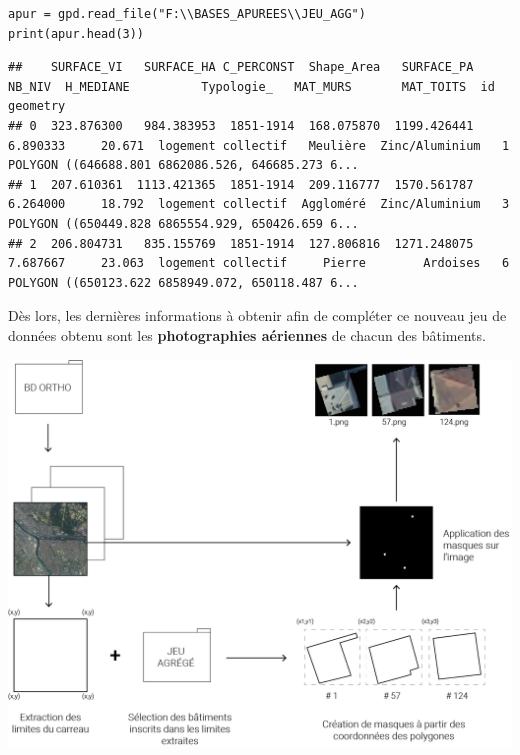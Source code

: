 \documentclass[
  11pt,
  french,
]{article}
\newcounter{customfigs}[section]
\newenvironment{customfigs}[1][] {
    \stepcounter{customfigs}
    Fig \arabic{section}. \arabic{customfigs} : }
\newcommand{\masked}{\vspace*{-\baselineskip}}
\begin{document}
\begin{tcolorbox}[title= Aperçu du jeu de données agrégé ,colback=boitecode]
\begin{lstlisting}[style=code]
apur = gpd.read_file("F:\\BASES_APUREES\\JEU_AGG")
print(apur.head(3))\end{lstlisting}
\begin{lstlisting}[style=out]
##    SURFACE_VI   SURFACE_HA C_PERCONST  Shape_Area   SURFACE_PA    NB_NIV  H_MEDIANE          Typologie_   MAT_MURS       MAT_TOITS  id                                           geometry
## 0  323.876300   984.383953  1851-1914  168.075870  1199.426441  6.890333     20.671  logement collectif   Meulière  Zinc/Aluminium   1  POLYGON ((646688.801 6862086.526, 646685.273 6...
## 1  207.610361  1113.421365  1851-1914  209.116777  1570.561787  6.264000     18.792  logement collectif  Aggloméré  Zinc/Aluminium   3  POLYGON ((650449.828 6865554.929, 650426.659 6...
## 2  206.804731   835.155769  1851-1914  127.806816  1271.248075  7.687667     23.063  logement collectif     Pierre        Ardoises   6  POLYGON ((650123.622 6858949.072, 650118.487 6...
\end{lstlisting}
\end{tcolorbox}

\hfill\break
\hfill\break
Dès lors, les dernières informations à obtenir afin de compléter ce
nouveau jeu de données obtenu sont les \textbf{photographies aériennes}
de chacun des bâtiments.\\

\begin{tcolorbox}[title=\begin{customfigs} Principe de l'extraction des photographies aériennes \end{customfigs}]

\begin{center}\includegraphics[width=1\linewidth]{__imgs/principe_agg_photo} \end{center}

\end{tcolorbox}
\end{document}
